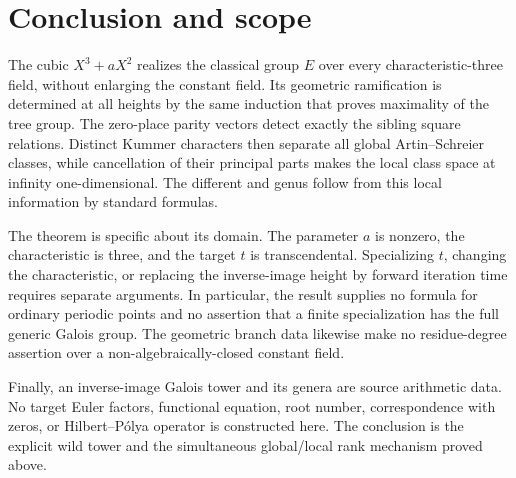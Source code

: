 \section{Conclusion and scope}\label{sec:conclusion}

The cubic $X^3+aX^2$ realizes the classical group $E$ over every
characteristic-three field, without enlarging the constant field.
Its geometric ramification is determined at all heights by the
same induction that proves maximality of the tree group. The
zero-place parity vectors detect exactly the sibling square
relations. Distinct Kummer characters then separate all global
Artin--Schreier classes, while cancellation of their principal
parts makes the local class space at infinity one-dimensional.
The different and genus follow from this local information by
standard formulas.

The theorem is specific about its domain. The parameter $a$ is
nonzero, the characteristic is three, and the target $t$ is
transcendental. Specializing $t$, changing the characteristic,
or replacing the inverse-image height by forward iteration time
requires separate arguments. In particular, the result supplies
no formula for ordinary periodic points and no assertion that a
finite specialization has the full generic Galois group. The
geometric branch data likewise make no residue-degree assertion
over a non-algebraically-closed constant field.

Finally, an inverse-image Galois tower and its genera are source
arithmetic data. No target Euler factors, functional equation,
root number, correspondence with zeros, or Hilbert--P\'olya
operator is constructed here. The conclusion is the explicit
wild tower and the simultaneous global/local rank mechanism
proved above.
